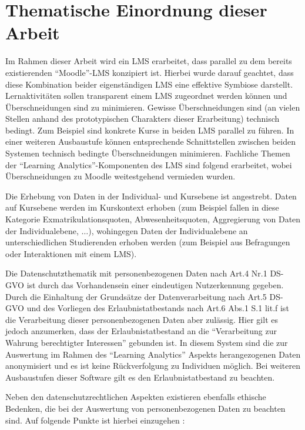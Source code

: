 \section{Thematische Einordnung dieser Arbeit}

Im Rahmen dieser Arbeit wird ein \ac{LMS} erarbeitet, dass parallel zu dem bereits existierenden \enquote{Moodle}-\ac{LMS} konzipiert ist. Hierbei wurde darauf geachtet, dass diese Kombination beider eigenständigen \ac{LMS} eine effektive Symbiose darstellt. Lernaktivitäten sollen transparent einem \ac{LMS} zugeordnet werden können und Überschneidungen sind zu minimieren. Gewisse Überschneidungen sind (an vielen Stellen anhand des prototypischen Charakters dieser Erarbeitung) technisch bedingt. Zum Beispiel sind konkrete Kurse in beiden \ac{LMS} parallel zu führen. In einer weiteren Ausbaustufe können entsprechende Schnittstellen zwischen beiden Systemen technisch bedingte Überschneidungen minimieren. Fachliche Themen der \enquote{Learning Analytics}-Komponenten des \ac{LMS} sind folgend erarbeitet, wobei Überschneidungen zu Moodle weitestgehend vermieden wurden. 

Die Erhebung von Daten in der Individual- und Kursebene ist angestrebt. Daten auf Kursebene werden im Kurskontext erhoben (zum Beispiel fallen in diese Kategorie Exmatrikulationsquoten, Abwesenheitsquoten, Aggregierung von Daten der Individualebene, $\ldots$), wohingegen Daten der Individualebene an unterschiedlichen Studierenden erhoben werden (zum Beispiel aus Befragungen oder Interaktionen mit einem \ac{LMS}).

Die Datenschutzthematik mit personenbezogenen Daten nach Art.4 Nr.1 DS-GVO ist durch das Vorhandensein einer eindeutigen Nutzerkennung gegeben. Durch die Einhaltung der Grundsätze der Datenverarbeitung nach Art.5 DS-GVO und des Vorliegen des Erlaubnistatbestands nach Art.6 Abs.1 S.1 lit.f ist die Verarbeitung dieser personenbezogenen Daten aber  zulässig. Hier gilt es jedoch anzumerken, dass der Erlaubnistatbestand an die \enquote{Verarbeitung zur Wahrung berechtigter Interessen} gebunden ist. In diesem System sind die zur Auswertung im Rahmen des \enquote{Learning Analytics} Aspekts herangezogenen Daten anonymisiert und es ist keine Rückverfolgung zu Individuen möglich. Bei weiteren Ausbaustufen dieser Software gilt es den Erlaubnistatbestand zu beachten. 

Neben den datenschutzrechtlichen Aspekten existieren ebenfalls ethische Bedenken, die bei der Auswertung von personenbezogenen Daten zu beachten sind. Auf folgende Punkte ist hierbei einzugehen \autocite[S.1510]{learningAnalyticsEthicalUssuesAndDilemmas}:

